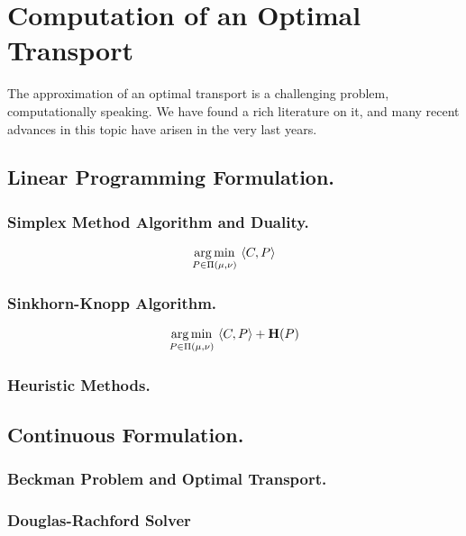 \chapter{Computation of an Optimal Transport}
The approximation of an optimal transport is a challenging problem, computationally speaking. We have found a rich literature on it, and many recent advances in this topic have arisen in the very last years. 
\section{Linear Programming Formulation.}
\subsection{Simplex Method Algorithm and Duality.}
\begin{equation}
	\displaystyle {\underset {P\in \Pi(\mu, \nu)}{\operatorname {arg\,min} }}\ {\left\langle C, P \right\rangle}
\end{equation}
\subsection{Sinkhorn-Knopp Algorithm.}


\begin{equation}
	\displaystyle {\underset {P\in \Pi(\mu, \nu)}{\operatorname {arg\,min} }}\ {\left\langle C, P \right\rangle+\mathbf{H}(P)}
\end{equation}
	
\subsection{Heuristic Methods.}

\section{Continuous Formulation.}
\subsection{Beckman Problem and Optimal Transport.}
\subsection{Douglas-Rachford Solver}


